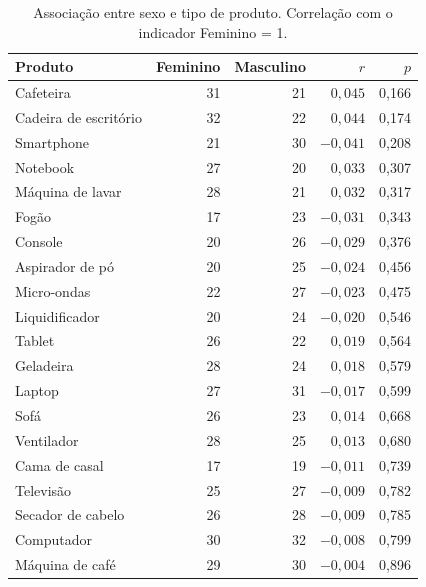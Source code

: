 \begin{table}[t]
    \centering
    \caption{Associação entre sexo e tipo de produto. Correlação com o indicador Feminino = 1.}
    \label{tab:q6-sexo}
    \footnotesize
    \setlength{\tabcolsep}{8pt}
    \begin{tabular}{@{}lrrrr@{}}
        \toprule
        Produto & Feminino & Masculino & \(r\) & \(p\) \\
        \midrule
        Cafeteira              & 31 & 21 & $0{,}045$  & 0,166 \\
        Cadeira de escritório  & 32 & 22 & $0{,}044$  & 0,174 \\
        Smartphone             & 21 & 30 & $-0{,}041$ & 0,208 \\
        Notebook               & 27 & 20 & $0{,}033$  & 0,307 \\
        Máquina de lavar       & 28 & 21 & $0{,}032$  & 0,317 \\
        Fogão                  & 17 & 23 & $-0{,}031$ & 0,343 \\
        Console                & 20 & 26 & $-0{,}029$ & 0,376 \\
        Aspirador de pó        & 20 & 25 & $-0{,}024$ & 0,456 \\
        Micro-ondas            & 22 & 27 & $-0{,}023$ & 0,475 \\
        Liquidificador         & 20 & 24 & $-0{,}020$ & 0,546 \\
        Tablet                 & 26 & 22 & $0{,}019$  & 0,564 \\
        Geladeira              & 28 & 24 & $0{,}018$  & 0,579 \\
        Laptop                 & 27 & 31 & $-0{,}017$ & 0,599 \\
        Sofá                   & 26 & 23 & $0{,}014$  & 0,668 \\
        Ventilador             & 28 & 25 & $0{,}013$  & 0,680 \\
        Cama de casal          & 17 & 19 & $-0{,}011$ & 0,739 \\
        Televisão              & 25 & 27 & $-0{,}009$ & 0,782 \\
        Secador de cabelo      & 26 & 28 & $-0{,}009$ & 0,785 \\
        Computador             & 30 & 32 & $-0{,}008$ & 0,799 \\
        Máquina de café        & 29 & 30 & $-0{,}004$ & 0,896 \\
        \bottomrule
    \end{tabular}
\end{table}

